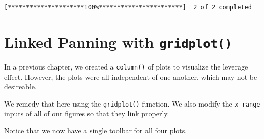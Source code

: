 \documentclass[
  letterpaper,
  DIV=11,
  numbers=noendperiod]{scrreprt}
\begin{document}
\begin{verbatim}
[*********************100%***********************]  2 of 2 completed
\end{verbatim}

\hypertarget{linked-panning-with-gridplot}{%
\section{\texorpdfstring{Linked Panning with
\texttt{gridplot()}}{Linked Panning with gridplot()}}\label{linked-panning-with-gridplot}}

In a previous chapter, we created a \texttt{column()} of plots to
visualize the leverage effect. However, the plots were all independent
of one another, which may not be desireable.

We remedy that here using the \texttt{gridplot()} function. We also
modify the \texttt{x\_range} inputs of all of our figures so that they
link properly.

Notice that we now have a single toolbar for all four plots.
\end{document}
